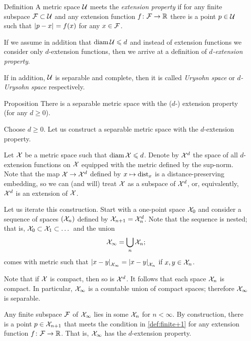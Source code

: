 \begin{thm}{Definition}\label{def:finite+1}
A metric space $\mathcal{U}$ meets the \emph{extension property}  if for any finite subspace $\mathcal{F}\subset\mathcal{U}$ and any extension function $f\colon\mathcal{F}\to\mathbb{R}$ there is a point $p\in \mathcal{U}$ such that $\dist{p}{x}{}=f(x)$ for any $x\in \mathcal{F}$.

If we assume in addition that $\operatorname{\rm diam}\nolimits \mathcal{U}\leqslant d$ and instead of extension functions we consider only $d$-extension functions, then we arrive at a definition of {}\emph{$d$-extension property}.

If in addition, $\mathcal{U}$ is separable and complete, then it is called \emph{Urysohn space} or {}\emph{$d$-Urysohn space} respectively.
\end{thm}


\begin{thm}{Proposition}\label{prop:univeral-separable}
There is a separable metric space with the ($d$-) extension property (for any $d\ge 0$).
\end{thm}

Choose $d\ge 0$.
Let us construct a separable metric space with  the $d$-extension property.

Let $\mathcal{X}$ be a metric space such that $\operatorname{\rm diam}\nolimits\mathcal{X}\leqslant d$.
Denote by $\mathcal{X}^d$ the space of all $d$-extension functions on $\mathcal{X}$ equipped with the metric defined by the sup-norm.
Note that the map $\mathcal{X} \to \mathcal{X}^d$ defined by $x\mapsto\mathrm{dist}_x$ is a distance-preserving embedding,
so we can (and will) treat $\mathcal{X}$ as a subspace of $\mathcal{X}^d$, or, equivalently, $\mathcal{X}^d$ is an extension of $\mathcal{X}$.

Let us iterate this construction.
Start with a one-point space $\mathcal{X}_0$ and consider a sequence of spaces $(\mathcal{X}_n)$ defined by $\spc{X}_{n+1}\z=\spc{X}_n^d$.
Note that the sequence is nested;
that is, $\mathcal{X}_0\subset \mathcal{X}_1\subset\dots$
and the union
\[\mathcal{X}_\infty=\bigcup_n\mathcal{X}_n;\]
comes with metric such that
$\dist{x}{y}{\spc{X}_\infty} = \dist{x}{y}{\spc{X}_n}$
if $x,y\in\mathcal{X}_n$.

Note that if $\mathcal{X}$ is compact, then so is $\mathcal{X}^d$.
It follows that each space $\mathcal{X}_n$ is compact.
In particular, $\mathcal{X}_\infty$ is a countable union of compact spaces;
therefore $\mathcal{X}_\infty$ is separable.

Any finite subspace $\mathcal{F}$ of $\mathcal{X}_\infty$ lies in some $\mathcal{X}_n$ for $n<\infty$.
By construction, there is a point $p\in \mathcal{X}_{n+1}$ that meets the condition in \ref{def:finite+1} for any extension function $f\colon\mathcal{F}\to\mathbb{R}$.
That is, $\mathcal{X}_\infty$ has the $d$-extension property.

